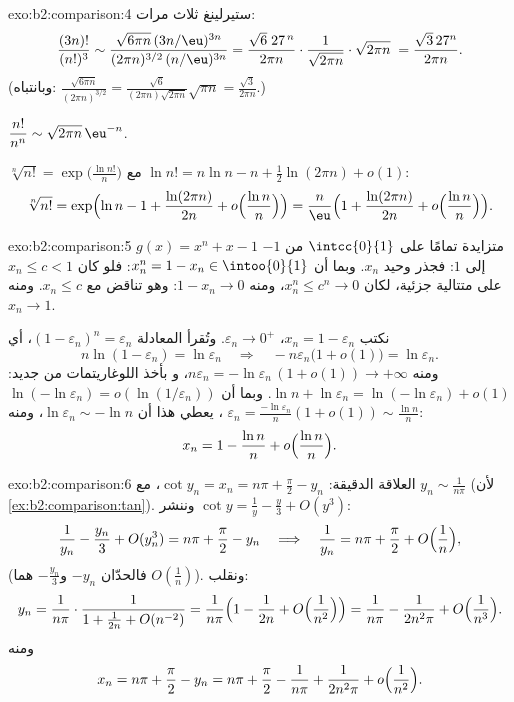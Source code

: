 \begin{solution}{exo:b2:comparison:4}
ستيرلينغ ثلاث مرات:
\[
\frac{(3n)!}{(n!)^3}
\sim \frac{\sqrt{6\pi n}\,(3n/\eu)^{3n}}
{(2\pi n)^{3/2}\,(n/\eu)^{3n}}
= \frac{\sqrt{6}\; 27^{\,n}}{2\pi n} \cdot
\frac{1}{\sqrt{2\pi n}}\cdot\sqrt{2\pi n}\;
= \frac{\sqrt3\,27^n}{2\pi n} .
\]
(وبانتباه: $\frac{\sqrt{6\pi n}}{(2\pi n)^{3/2}} =
\frac{\sqrt6}{(2\pi n)\sqrt{2\pi n}}\sqrt{\pi n} =
\frac{\sqrt3}{2\pi n}$.)

$\dfrac{n!}{n^n} \sim \sqrt{2\pi n}\,\eu^{-n}$.

$\sqrt[n]{n!} = \exp\bigl(\frac{\ln n!}{n}\bigr)$ مع $\ln n! = n\ln
n - n + \frac12\ln(2\pi n) + o(1)$:
\[
\sqrt[n]{n!} = \exp\Bigl(\ln n - 1 + \frac{\ln(2\pi n)}{2n} +
o\Bigl(\frac{\ln n}{n}\Bigr)\Bigr)
= \frac{n}{\eu}\Bigl(1 + \frac{\ln(2\pi n)}{2n} +
o\Bigl(\frac{\ln n}{n}\Bigr)\Bigr).
\]
\end{solution}

\begin{solution}{exo:b2:comparison:5}
$g(x) = x^n + x - 1$ متزايدة تمامًا على $\intcc{0}{1}$ من $-1$
إلى $1$: فجذر وحيد $x_n$. وبما أن $x_n^n = 1 - x_n \in
\intoo{0}{1}$: فلو كان $x_n \leq c < 1$ على متتالية جزئية، لكان $x_n^n
\leq c^n \to 0$، ومنه $1 - x_n \to 0$: وهو تناقض مع $x_n \leq
c$. ومنه $x_n \to 1$.

نكتب $x_n = 1 - \varepsilon_n$، $\varepsilon_n \to 0^+$. وتُقرأ
المعادلة $(1 - \varepsilon_n)^n = \varepsilon_n$، أي
\[
n\ln(1 - \varepsilon_n) = \ln \varepsilon_n
\quad\Longrightarrow\quad
-n\varepsilon_n\bigl(1 + o(1)\bigr) = \ln\varepsilon_n .
\]
ومنه $n\varepsilon_n = -\ln\varepsilon_n\,(1 + o(1)) \to +\infty$، و
بأخذ اللوغاريتمات من جديد: $\ln n + \ln\varepsilon_n =
\ln(-\ln\varepsilon_n) + o(1)$. وبما أن $\ln(-\ln \varepsilon_n) =
o(\ln(1/\varepsilon_n))$، يعطي هذا أن $\ln\varepsilon_n \sim -\ln
n$، ومنه $\varepsilon_n = \frac{-\ln\varepsilon_n}{n}(1 + o(1))
\sim \frac{\ln n}{n}$:
\[
x_n = 1 - \frac{\ln n}{n} + o\Bigl(\frac{\ln n}{n}\Bigr) .
\]
\end{solution}

\begin{solution}{exo:b2:comparison:6}
العلاقة الدقيقة: $\cot y_n = x_n = n\pi + \frac\pi2 - y_n$، مع $y_n
\sim \frac{1}{n\pi}$ (لأن \cref{ex:b2:comparison:tan}). وننشر $\cot y
= \frac1y - \frac y3 + O(y^3)$:
\[
\frac{1}{y_n} - \frac{y_n}{3} + O(y_n^3) = n\pi + \frac\pi2 - y_n
\quad\Longrightarrow\quad
\frac{1}{y_n} = n\pi + \frac\pi2 + O\Bigl(\frac1n\Bigr),
\]
(فالحدّان $-y_n$ و$-\frac{y_n}{3}$ هما $O(\frac1n)$). ونقلب:
\[
y_n = \frac{1}{n\pi}\cdot\frac{1}{1 + \frac{1}{2n} + O(n^{-2})}
= \frac{1}{n\pi}\Bigl(1 - \frac{1}{2n} + O\Bigl(\frac{1}{n^2}\Bigr)\Bigr)
= \frac{1}{n\pi} - \frac{1}{2n^2\pi} + O\Bigl(\frac{1}{n^3}\Bigr).
\]
ومنه
\[
x_n = n\pi + \frac{\pi}{2} - y_n
= n\pi + \frac\pi2 - \frac{1}{n\pi} + \frac{1}{2n^2\pi} +
o\Bigl(\frac{1}{n^2}\Bigr).
\]
\end{solution}

